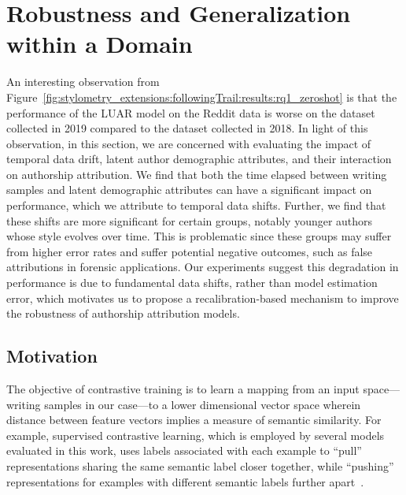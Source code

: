 \section{Robustness and Generalization within a Domain}

An interesting observation from Figure~\ref*{fig:stylometry_extensions:followingTrail:results:rq1_zeroshot} is that the performance of the LUAR model on the Reddit data is worse on the dataset collected in 2019 compared to the dataset collected in 2018.
In light of this observation, in this section, we are concerned with evaluating the impact of temporal data drift, latent author demographic attributes, and their interaction on authorship attribution.
We find that both the time elapsed between writing samples and latent demographic attributes can have a significant impact on performance, which we attribute to temporal data shifts.
Further, we find that these shifts are more significant for certain groups, notably younger authors whose style evolves over time.
This is problematic since these groups may suffer from higher error rates and suffer potential negative outcomes, such as false attributions in forensic applications.
Our experiments suggest this degradation in performance is due to fundamental data shifts, rather than model estimation error, which motivates us to propose a recalibration-based mechanism to improve the robustness of authorship attribution models.

\subsection{Motivation}

The objective of contrastive training is to learn a mapping from an input space---writing samples in our case---to a lower dimensional vector space wherein distance between feature vectors implies a measure of semantic similarity. 
For example, supervised contrastive learning, which is employed by several models evaluated in this work, uses labels associated with each example to ``pull'' representations sharing the same semantic label closer together, while ``pushing'' representations for examples with different semantic labels further apart~\cite{khosla2020supervised}. 

